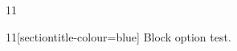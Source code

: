 \documentclass[paper=A4]{ropas-poster}
\begin{document}
\begin{postergrid}{1}{1}
\begin{posterblock}{1}{1}[sectiontitle-colour=blue]
Block option test.
\end{posterblock}
\end{postergrid}
\end{document}
